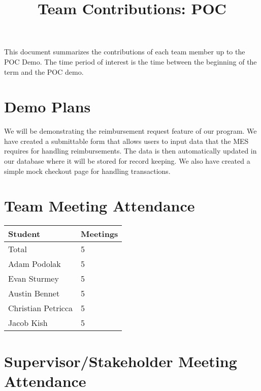 \documentclass{article}
\title{Team Contributions: POC\\\progname}
\author{\authname}
\date{}
\begin{document}
\maketitle

This document summarizes the contributions of each team member up to the POC
Demo.  The time period of interest is the time between the beginning of the term
and the POC demo.

\section{Demo Plans}


We will be demonstrating the reimbursement request feature of our program. We have created a submittable form that allows users to input data that the MES requires for handling reimbursements. The data is then automatically updated in our database where it will be stored for record keeping. We also have created a simple mock checkout page for handling transactions. 

\section{Team Meeting Attendance}


\begin{table}[H]
\centering
\begin{tabular}{ll}
\toprule
\textbf{Student} & \textbf{Meetings}\\
\midrule
Total & 5\\
Adam Podolak & 5\\
Evan Sturmey & 5\\
Austin Bennet & 5\\
Christian Petricca & 5\\
Jacob Kish & 5\\
\bottomrule
\end{tabular}
\end{table}


\section{Supervisor/Stakeholder Meeting Attendance}
\end{document}
